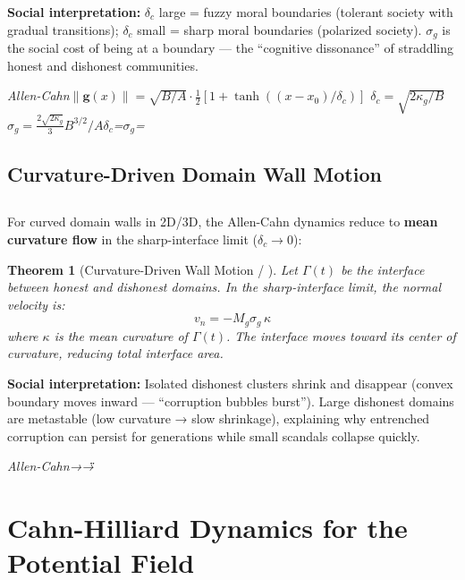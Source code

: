\documentclass[12pt,a4paper]{article}
\theoremstyle{plain}
\newtheorem{theorem}{ Theorem}[section]
\theoremstyle{definition}
\newcommand{\gf}{\mathbf{g}}          %
\newcommand{\deltac}{\delta_c}        %
\newcommand{\cn}[1]{\textcolor{scxgray}{\textit{#1}}}
\begin{document}
\textbf{Social interpretation:} $\deltac$ large = fuzzy moral boundaries
(tolerant society with gradual transitions); $\deltac$ small = sharp
moral boundaries (polarized society). $\sigma_g$ is the social cost of
being at a boundary — the ``cognitive dissonance'' of straddling
honest and dishonest communities.

\bigskip
\noindent
\cn{Allen-Cahn$\|\gf(x)\|=\sqrt{B/A}\cdot\frac{1}{2}[1+\tanh((x-x_0)/\deltac)]$ $\deltac=\sqrt{2\kappa_g/B}$ $\sigma_g=\frac{2\sqrt{2\kappa_g}}{3}B^{3/2}/A$$\deltac$=$\sigma_g$=}

\subsection{Curvature-Driven Domain Wall Motion}
\subsection*{}

For curved domain walls in 2D/3D, the Allen-Cahn dynamics reduce to
\textbf{mean curvature flow} in the sharp-interface limit ($\deltac\to0$):

\begin{theorem}[Curvature-Driven Wall Motion / ]
\label{thm:curvature_motion}
Let $\Gamma(t)$ be the interface between honest and dishonest domains.
In the sharp-interface limit, the normal velocity is:
\begin{equation}
    v_n = -M_g \sigma_g \, \kappa
    \label{eq:curvature_flow}
\end{equation}
where $\kappa$ is the mean curvature of $\Gamma(t)$. The interface moves
toward its center of curvature, reducing total interface area.
\end{theorem}

\textbf{Social interpretation:} Isolated dishonest clusters shrink and
disappear (convex boundary moves inward — ``corruption bubbles burst'').
Large dishonest domains are metastable (low curvature → slow shrinkage),
explaining why entrenched corruption can persist for generations while
small scandals collapse quickly.

\bigskip
\noindent
\cn{Allen-Cahn→\"\"→}

\section{Cahn-Hilliard Dynamics for the Potential Field}
\end{document}

